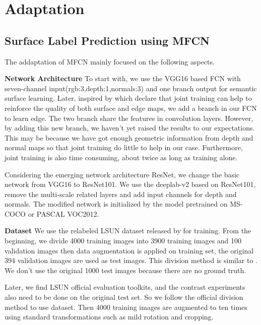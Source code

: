 \section{Adaptation}
\label{sec:Adapt}

\subsection{Surface Label Prediction using MFCN}
\label{subsection:MFCN}
The addaptation of MFCN mainly focused on the following aspects.

\textbf{Network Architecture}
To start with, we use the VGG16 based FCN with seven-channel input(rgb:3,depth:1,normals:3) and one branch output for semantic surface learning. Later, inspired by \cite{ren2016coarse,mallya2015learning} which declare that joint training can help to reinforce the quality of both surface and edge maps, we add a branch in our FCN to learn edge. The two branch share the features in convolution layers. However, by adding this new branch, we haven't yet raised the results to our expectations. This may be because we have got enough geometric information from depth and normal maps so that joint training do little to help in our case. Furthermore, joint training is also time consuming, about twice as long as training alone.

Considering the emerging network architecture ResNet, we change the basic network from VGG16 to ResNet101. We use the deeplab-v2 based on ResNet101, remove the multi-scale related layers and add input channels for depth and normals. The modified network is initialized by the model pretrained on MS-COCO or PASCAL VOC2012.  


\textbf{Dataset}
We use the relabeled LSUN dataset released by \cite{ren2016coarse} for training. From the beginning, we divide 4000 training images into 3900 training images and 100 validation images then data augmentation is applied on training set, the original 394 validation images are used as test images. This division method is similar to \cite{ren2016coarse}. We don't use the original 1000 test images because there are no ground truth.

Later, we find LSUN official evaluation toolkits, and the contrast experiments also need to be done on the original test set. So we follow the official division method to use dataset. Then 4000 training images are augmented to ten times using standard transformations such as mild rotation and cropping.   



	
